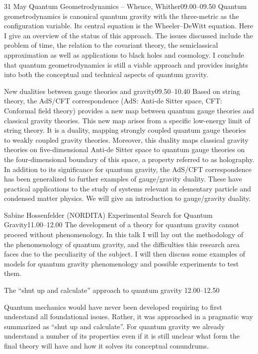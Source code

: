 \documentclass{conference}
\begin{document}
\MakeTitle


\begin{Day}{31 May}
    {Quantum Geometrodynamics -- Whence, Whither}{09.00--09.50}
        {Quantum geometrodynamics is canonical quantum gravity with the
three-metric as the configuration variable. Its central equation is
the Wheeler--DeWitt equation. Here I give an overview of
the status of this approach. The issues discussed
include the
problem of time, the relation to the covariant theory, the
semiclassical approximation as well as applications to black holes and
cosmology. I conclude that quantum
geometrodynamics is still a viable approach and provides insights into
both the conceptual and technical aspects of quantum gravity.}

    {New dualities between gauge theories and gravity}{09.50--10.40}
    {Based on string theory, the AdS/CFT correspondence (AdS: Anti-de Sitter space, CFT: Conformal field theory) provides a new map between quantum gauge theories and classical gravity theories. This new map arises from a specific low-energy limit of string theory. It is a duality, mapping strongly coupled quantum gauge theories to weakly coupled gravity theories. Moreover, this duality maps classical gravity theories on five-dimensional Anti-de Sitter space to quantum gauge theories on the four-dimensional boundary of this space, a property referred to as holography. In addition to its significance for quantum gravity, the AdS/CFT correspondence has been generalized to further examples of gauge/gravity duality. These have practical applications to the study of systems relevant in elementary particle and condensed matter physics. We will give an introduction to gauge/gravity duality.}


    {Sabine Hossenfelder (NORDITA)}
    {Experimental Search for Quantum Gravity}{11.00--12.00}
    {The development of a theory for quantum gravity cannot proceed
without phenomenology. In this talk I will lay out the methodology
of the phenomenology of quantum gravity, and the difficulties
this research area faces due to the peculiarity of the subject. I
will then discuss some examples of models for quantum gravity 
phenomenology and possible experiments to test them.}

  {The ``shut up and calculate'' approach to quantum gravity}
  {12.00--12.50}
  {Quantum mechanics would have never been developed requiring to first understand all foundational issues. Rather, it was approached in a pragmatic way summarized as “shut up and calculate”. For quantum gravity we already understand a number of its properties even if it is still unclear what form the final theory will have and how it solves its conceptual conundrums.

}
\end{Day}
\end{document}
